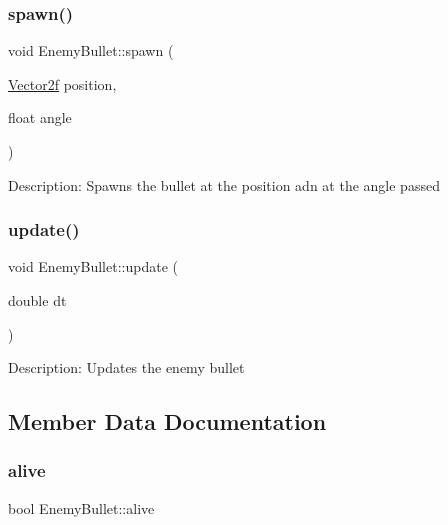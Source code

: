 \mbox{\label{class_enemy_bullet_a71bda569adc832b5438b2452942a7246}} 
\subsubsection{\texorpdfstring{spawn()}{spawn()}}
{\footnotesize\ttfamily void Enemy\+Bullet\+::spawn (\begin{DoxyParamCaption}\item[{\mbox{\hyperlink{class_vector2f}{Vector2f}}}]{position,  }\item[{float}]{angle }\end{DoxyParamCaption})}

Description\+: Spawns the bullet at the position adn at the angle passed \mbox{\label{class_enemy_bullet_a127b1d58aa26ac06559f7cebf183b940}} 
\subsubsection{\texorpdfstring{update()}{update()}}
{\footnotesize\ttfamily void Enemy\+Bullet\+::update (\begin{DoxyParamCaption}\item[{double}]{dt }\end{DoxyParamCaption})}

Description\+: Updates the enemy bullet 

\subsection{Member Data Documentation}
\mbox{\label{class_enemy_bullet_a0e3d53bac30ca999801134e4a3d04ad0}} 
\subsubsection{\texorpdfstring{alive}{alive}}
{\footnotesize\ttfamily bool Enemy\+Bullet\+::alive}

\mbox{\label{class_enemy_bullet_a562c7fa519326360d6a4909367b68108}} 
